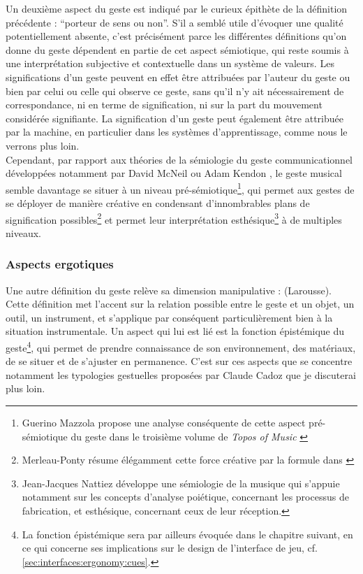 \noindent Un deuxième aspect du geste est indiqué par le curieux épithète de la définition précédente : ``porteur de sens ou non''. S'il a semblé utile d'évoquer une qualité potentiellement absente, c'est précisément parce les différentes définitions qu'on donne du geste dépendent en partie de cet aspect sémiotique, qui reste soumis à une interprétation subjective et contextuelle dans un système de valeurs. Les significations d'un geste peuvent en effet être attribuées par l'auteur du geste ou bien par celui ou celle qui observe ce geste, sans qu'il n'y ait nécessairement de correspondance, ni en terme de signification, ni sur la part du mouvement considérée signifiante. La signification d'un geste peut également être attribuée par la machine, en particulier dans les systèmes d'apprentissage, comme nous le verrons plus loin.\\
\indent Cependant, par rapport aux théories de la sémiologie du geste communicationnel développées notamment par David McNeil \cite{mcneill_gesture_2005} ou Adam Kendon \cite{kendon_gesture:_2004}, le geste musical semble davantage se situer à un niveau pré-sémiotique\footnote{Guerino Mazzola propose une analyse conséquente de cette aspect pré-sémiotique du geste dans le troisième volume de \textit{Topos of Music} \cite{mazzola_topos_2018}}, qui permet aux gestes de se déployer de manière créative en condensant d'innombrables plans de signification possibles\footnote{Merleau-Ponty résume élégamment cette force créative par la formule  dans \cite{merleau-ponty_phenomenologie_1976}} et permet leur interprétation esthésique\footnote{Jean-Jacques Nattiez développe une sémiologie de la musique qui s'appuie notamment sur les concepts d'analyse poiétique, concernant les processus de fabrication, et esthésique, concernant ceux de leur réception.} à de multiples niveaux.

\subsubsection{Aspects ergotiques}

\noindent Une autre définition du geste relève sa dimension manipulative :  (Larousse). Cette définition met l'accent sur la relation possible entre le geste et un objet, un outil, un instrument, et s'applique par conséquent particulièrement bien à la situation instrumentale. Un aspect qui lui est lié est la fonction épistémique du geste\footnote{La fonction épistémique sera par ailleurs évoquée dans le chapitre suivant, en ce qui concerne ses implications sur le design de l'interface de jeu, cf. \ref{sec:interfaces:ergonomy:cues}.}, qui permet de prendre connaissance de son environnement, des matériaux, de se situer et de s'ajuster en permanence. C'est sur ces aspects que se concentre notamment les typologies gestuelles proposées par Claude Cadoz que je discuterai plus loin.\\

